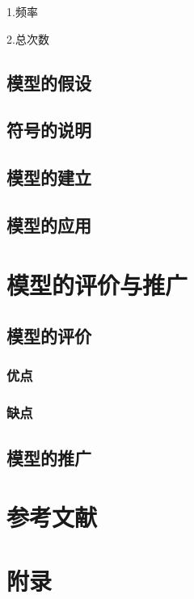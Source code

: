 \documentclass[12pt]{article}
\begin{document}
1.频率

2.总次数

\subsection{模型的假设}

\subsection{符号的说明}

\subsection{模型的建立}

\subsection{模型的应用}

{\centering\section{模型的评价与推广}}

\subsection{模型的评价}

\subsubsection{优点}

\subsubsection{缺点}

\subsection{模型的推广}

\newpage
\appendix
{\centering\section*{参考文献}}
{\centering\section*{附录}}
\end{document}
